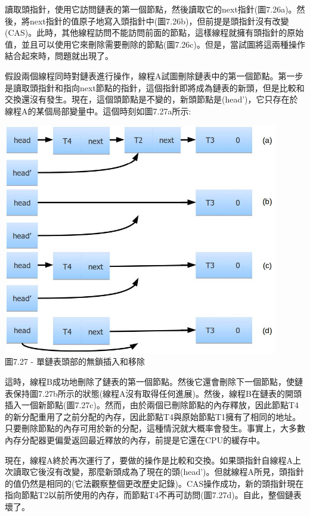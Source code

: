 讀取頭指針，使用它訪問鏈表的第一個節點，然後讀取它的next指針(圖7.26a)。然後，將next指針的值原子地寫入頭指針中(圖7.26b)，但前提是頭指針沒有改變(CAS)。此時，其他線程訪問不能訪問前面的節點，這樣線程就擁有頭指針的原始值，並且可以使用它來刪除需要刪除的節點(圖7.26c)。但是，當試圖將這兩種操作結合起來時，問題就出現了。

假設兩個線程同時對鏈表進行操作，線程A試圖刪除鏈表中的第一個節點。第一步是讀取頭指針和指向next節點的指針，這個指針即將成為鏈表的新頭，但是比較和交換還沒有發生。現在，這個頭節點是不變的，新頭節點是(head')，它只存在於線程A的某個局部變量中。這個時刻如圖7.27a所示:

\begin{center}
\includegraphics[width=0.9\textwidth]{content/2/chapter7/images/27.jpg}\\
圖7.27 - 單鏈表頭部的無鎖插入和移除
\end{center}

這時，線程B成功地刪除了鏈表的第一個節點。然後它還會刪除下一個節點，使鏈表保持圖7.27b所示的狀態(線程A沒有取得任何進展)。然後，線程B在鏈表的開頭插入一個新節點(圖7.27c)。然而，由於兩個已刪除節點的內存釋放，因此節點T4的新分配重用了之前分配的內存，因此節點T4與原始節點T1擁有了相同的地址。只要刪除節點的內存可用於新的分配，這種情況就大概率會發生。事實上，大多數內存分配器更偏愛返回最近釋放的內存，前提是它還在CPU的緩存中。

現在，線程A終於再次運行了，要做的操作是比較和交換。如果頭指針自線程A上次讀取它後沒有改變，那麼新頭成為了現在的頭(head')。但就線程A所見，頭指針的值仍然是相同的(它法觀察整個更改歷史記錄)。CAS操作成功，新的頭指針現在指向節點T2以前所使用的內存，而節點T4不再可訪問(圖7.27d)。自此，整個鏈表壞了。

